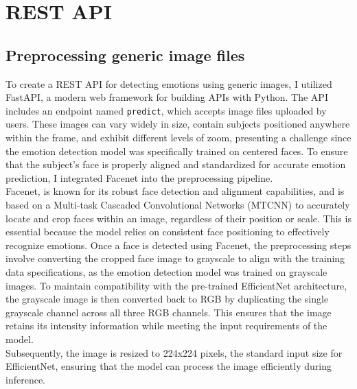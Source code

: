 \documentclass{article}
\begin{document}
\section*{REST API}

\subsection*{Preprocessing generic image files}
To create a REST API for detecting emotions using generic images, I utilized FastAPI, a modern web framework for building APIs with Python. The API includes an endpoint named \texttt{predict}, which accepts image files uploaded by users. 
These images can vary widely in size, contain subjects positioned anywhere within the frame, and exhibit different levels of zoom, presenting a challenge since the emotion detection model was specifically trained on centered faces. 
To ensure that the subject's face is properly aligned and standardized for accurate emotion prediction, I integrated Facenet into the preprocessing pipeline.
\\
Facenet, is known for its robust face detection and alignment capabilities, and is based on a Multi-task Cascaded Convolutional Networks (MTCNN) to accurately locate and crop faces within an image, regardless of their position or scale. 
This is essential because the model relies on consistent face positioning to effectively recognize emotions.
Once a face is detected using Facenet, the preprocessing steps involve converting the cropped face image to grayscale to align with the training data specifications, as the emotion detection model was trained on grayscale images. 
To maintain compatibility with the pre-trained EfficientNet architecture, the grayscale image is then converted back to RGB by duplicating the single grayscale channel across all three RGB channels. 
This ensures that the image retains its intensity information while meeting the input requirements of the model.
\\
Subsequently, the image is resized to 224x224 pixels, the standard input size for EfficientNet, ensuring that the model can process the image efficiently during inference.
\end{document}
